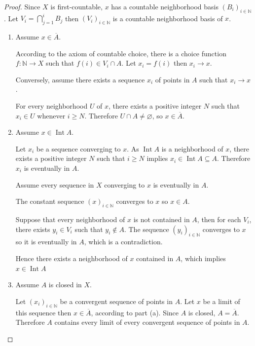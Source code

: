 \begin{proof}
    Since \( X \) is first-countable, \( x \) has a countable neighborhood basis \( {(B_{i})}_{i\in\mathbb{N}} \). Let \( V_{i} = \bigcap_{j=1}^{i} B_{j} \) then \( {(V_{i})}_{i\in\mathbb{N}} \) is a countable neighborhood basis of \( x \).

    \begin{enumerate}[itemsep=0pt,label={(\alph*)}]
        \item Assume \( x \in \overline{A} \).

              According to the axiom of countable choice, there is a choice function \( f: \mathbb{N} \to X \) such that \( f(i) \in V_{i} \cap A \). Let \( x_{i} = f(i) \) then \( x_{i} \to x \).

              Conversely, assume there exists a sequence \( x_{i} \) of points in \( A \) such that \( x_{i} \to x \).

              For every neighborhood \( U \) of \( x \), there exists a positive integer \( N \) such that \( x_{i} \in U \) whenever \( i \ge N \). Therefore \( U \cap A \ne \varnothing \), so \( x \in \overline{A} \).
        \item Assume \( x \in \operatorname{Int} A \).

              Let \( x_{i} \) be a sequence converging to \( x \). As \( \operatorname{Int} A \) is a neighborhood of \( x \), there exists a positive integer \( N \) such that \( i \ge N \) implies \( x_{i} \in \operatorname{Int} A \subseteq A \). Therefore \( x_{i} \) is eventually in \( A \).

              Assume every sequence in \( X \) converging to \( x \) is eventually in \( A \).

              The constant sequence \( {(x)}_{i\in\mathbb{N}} \) converges to \( x \) so \( x \in A \).

              Suppose that every neighborhood of \( x \) is not contained in \( A \), then for each \( V_{i} \), there exists \( y_{i} \in V_{i} \) such that \( y_{i} \notin A \). The sequence \( {(y_{i})}_{i\in\mathbb{N}} \) converges to \( x \) so it is eventually in \( A \), which is a contradiction.

              Hence there exists a neighborhood of \( x \) contained in \( A \), which implies \( x \in \operatorname{Int} A \)
        \item Assume \( A \) is closed in \( X \).

              Let \( {(x_{i})}_{i\in\mathbb{N}} \) be a convergent sequence of points in \( A \). Let \( x \) be a limit of this sequence then \( x \in \overline{A} \), according to part (a). Since \( A \) is closed, \( A = \overline{A} \). Therefore \( A \) contains every limit of every convergent sequence of points in \( A \).


\end{enumerate}
\end{proof}
